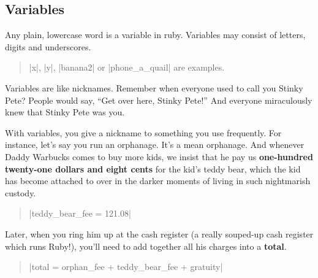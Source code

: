 \documentclass[12pt,twoside]{report}
\begin{document}
\subsection{Variables}



Any plain, lowercase word is a variable in ruby.  Variables may
consist of letters, digits and underscores.

\begin{quote}
\rubyinline|x|, \rubyinline|y|,
\rubyinline|banana2| or
\rubyinline|phone_a_quail| are examples.\end{quote}


Variables are like nicknames.  Remember when everyone used to call you
Stinky Pete? People would say, ``Get over here, Stinky Pete!''  And
everyone miraculously knew that Stinky Pete was you.

With variables, you give a nickname to something you use frequently.
For instance, let's say you run an orphanage.  It's a mean orphanage.
And whenever Daddy Warbucks comes to buy more kids, we insist that he
pay us {\bf one-hundred twenty-one dollars and eight cents} for the
kid's teddy bear, which the kid has become attached to over in the
darker moments of living in such nightmarish custody.

\begin{quote}
\rubyinline|teddy_bear_fee = 121.08|\end{quote}


Later, when you ring him up at the cash register (a really souped-up
cash register which runs Ruby!), you'll need to add together all his
charges into a {\bf total}.

\begin{quote}
\rubyinline|total = orphan_fee + teddy_bear_fee + gratuity|\end{quote}
\end{document}
